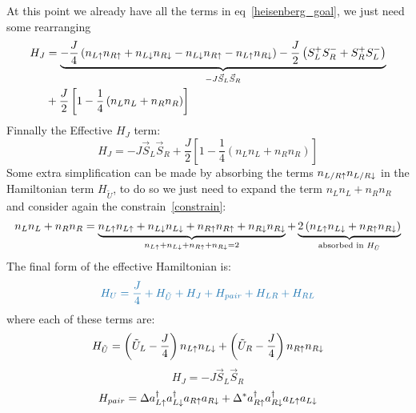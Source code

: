 At this point we already have all the terms in eq~\eqref{heisenberg_goal}, we just need some rearranging
\begin{equation}
   \begin{split}
      H_J &= \underbrace{-\frac{J}{4}\left(n_{L\uparrow}n_{R\uparrow}+n_{L\downarrow}n_{R\downarrow}-
    n_{L\downarrow}n_{R\uparrow}-n_{L\uparrow}n_{R\downarrow}\right)
    -\frac{J}{2}\left(S^+_LS^-_R + S^+_RS^-_L\right)}_{-J\vec{S}_L\vec{S}_R}\\
    &+
        \frac{J}{2}\left[1 - \frac{1}{4}\left(n_Ln_L + n_Rn_R\right)\right]
   \end{split}
\end{equation}
Finnally the Effective $H_J$ term:
\begin{equation}
  H_J = -J\vec{S}_L\vec{S}_R +
      \frac{J}{2}\left[1 - \frac{1}{4}\left(n_Ln_L + n_Rn_R\right)\right]
\end{equation}
Some extra simplification can be made by absorbing the terms $n_{L/R\uparrow}n_{L/R\downarrow}$ in the Hamiltonian term $H_{\tilde{U}}$, to do so we just need to expand the term $n_Ln_L + n_Rn_R$ and consider again the constrain~\eqref{constrain}:
\begin{equation}
  n_Ln_L + n_Rn_R =
  \underbrace{n_{L\uparrow}n_{L\uparrow} + n_{L\downarrow}n_{L\downarrow} + n_{R\uparrow}n_{R\uparrow} +
   n_{R\downarrow}n_{R\downarrow}}_{n_{L\uparrow}+n_{L\downarrow}+n_{R\uparrow}+n_{R\downarrow} = 2} +
  \underbrace{2\left(n_{L\uparrow}n_{L\downarrow}+
   n_{R\uparrow}n_{R\downarrow}\right)}_{\text{absorbed in }H_{\tilde{U}}}
\end{equation}
The final form of the effective Hamiltonian is:
\begin{equation}
   \color{blue}
  H_U = \frac{J}{4} + H_{\tilde{U}} + H_J + H_{pair} + H_{LR} + H_{RL}
\label{effective_ham}
\end{equation}
where each of these terms are:
\begin{equation}
  H_{\tilde{U}} =
  \left(\tilde{U}_L-\frac{J}{4}\right) n_{L\uparrow}n_{L\downarrow} +
  \left(\tilde{U}_R-\frac{J}{4}\right) n_{R\uparrow}n_{R\downarrow}
\end{equation}
\begin{equation}
  H_J = -J\vec{S}_L\vec{S}_R
\end{equation}
\begin{equation}
  H_{pair} = \Delta a^{\dagger}_{L\uparrow}a^{\dagger}_{L\downarrow}a_{R\uparrow}a_{R\downarrow}+
             \Delta^* a^{\dagger}_{R\uparrow}a^{\dagger}_{R\downarrow}a_{L\uparrow}a_{L\downarrow}
\end{equation}
